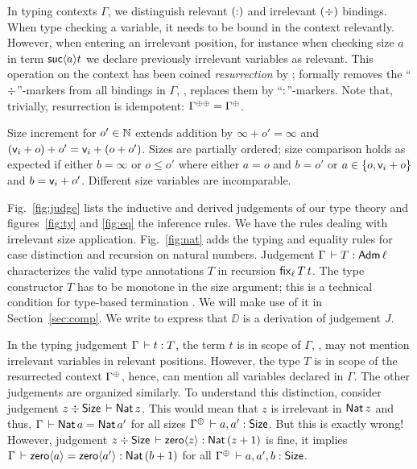 \documentclass[acmsmall%
]{acmart}\settopmatter{printfolios=true}
\begin{document}


In typing contexts $\Gamma$, we distinguish relevant $(\noterased)$ and irrelevant $(\erased)$ bindings.
When type checking a variable, it needs to be bound in the context relevantly.  However, when entering an irrelevant position, for instance when checking size $a$ in term $\suc a t$ we declare previously irrelevant variables as relevant.
This operation on the context has been coined
\emph{resurrection} by \citet{pfenning:lics01}; formally \fbox{$\resurrect\Gamma$} removes
the ``$\erased$''-markers from all bindings in $\Gamma$, \ie, replaces
them by ``$\noterased$''-markers.  Note that, trivially, resurrection is idempotent: $\resurrecttwice\Gamma = \resurrect{\Gamma}$.

Size increment  for $o' \in \NN$ extends addition by $\infty + o' = \infty$ and $(\ind i + o) + o' = \ind i + (o + o')$.  Sizes are partially ordered; size comparison  holds as expected if either $b = \infty$ or  $o \leq o'$ where either $a = o$ and $b = o'$ or $a \in \{ o, \ind i + o \}$ and $b = \ind i + o'$.
Different size variables are incomparable.





Fig.~\ref{fig:judge} lists the inductive and derived judgements of our type theory and
figures~\ref{fig:ty} and \ref{fig:eq} the inference rules.
We have  the rules dealing with irrelevant size application.
Fig.~\ref{fig:nat} adds the typing and equality rules for case distinction
and recursion on natural numbers.
Judgement $\Gamma \der T : \Adm \ell$ characterizes the valid type
annotations $T$ in recursion $\fix[\ell] T t$.  The type constructor $T$
has to be monotone in the size argument; this is a technical condition
for type-based termination \cite{gimenez:typeBased}.  We will make use
of it in Section~\ref{sec:comp}.
We write  to express that $\DD$ is a derivation of judgement $J$.

In the typing judgement $\Gamma \der t : T$, the term $t$ is in scope of
$\Gamma$, \ie, may not mention irrelevant variables in relevant
positions.  However, the type $T$ is in scope of the resurrected
context $\resurrect\Gamma$, hence, can mention all variables declared
in $\Gamma$.  The other judgements are organized similarly.  To
understand this distinction, consider judgement
$z \div \Size \der \Nat z$.  This would mean that $z$ is irrelevant in
$\Nat z$ and thus, $\Gamma \der \Nat a = \Nat {a'}$ for all sizes
$\resurrect\Gamma \der a,a' : \Size$.  But this is exactly wrong!  However,
judgement $z \div \Size \der \zero z : \Nat (z + 1)$ is fine, it
implies $\Gamma \der \zero a = \zero {a'} : \Nat (b+1)$ for all
$\resurrect\Gamma \der a,a',b : \Size$.
\end{document}
